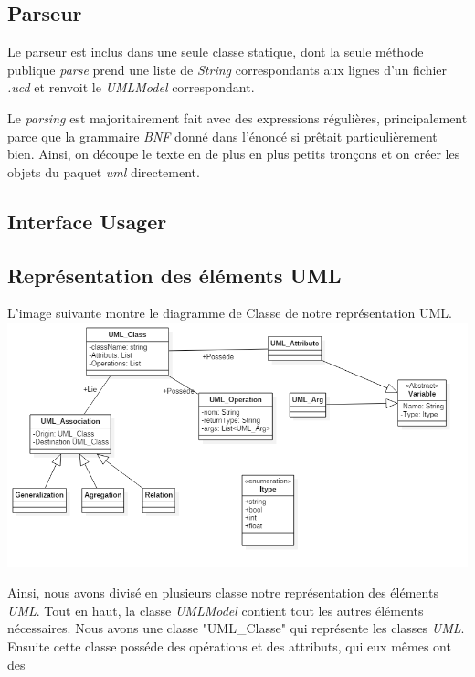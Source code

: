 \documentclass[letter,french]{report}
\begin{document}
\subsection{Parseur}
Le parseur est inclus dans une seule classe statique, dont la seule méthode
publique \emph{parse} prend une liste de \emph{String} correspondants aux lignes d'un
fichier \emph{.ucd} et renvoit le \emph{UMLModel} correspondant. 

Le \emph{parsing} est majoritairement fait avec des expressions régulières,
principalement parce que la grammaire \emph{BNF} donné dans l'énoncé si
prêtait particulièrement bien. Ainsi, on découpe le texte en de plus en plus
petits tronçons et on créer les objets du paquet \emph{uml} directement.

\subsection{Interface Usager}


\subsection{Représentation des éléments UML}
L'image suivante montre le diagramme de Classe de notre représentation UML.
\newline 
\includegraphics[scale=.3]{DiagrammeClasse.png}

Ainsi, nous avons divisé en plusieurs classe notre représentation des éléments
\emph{UML}. Tout en haut, la classe \emph{UMLModel} contient tout les autres
éléments nécessaires. Nous avons une classe "UML\_Classe" qui représente les
classes \emph{UML}. Ensuite cette classe posséde des opérations et des attributs, qui eux mêmes ont
des 
\end{document}
